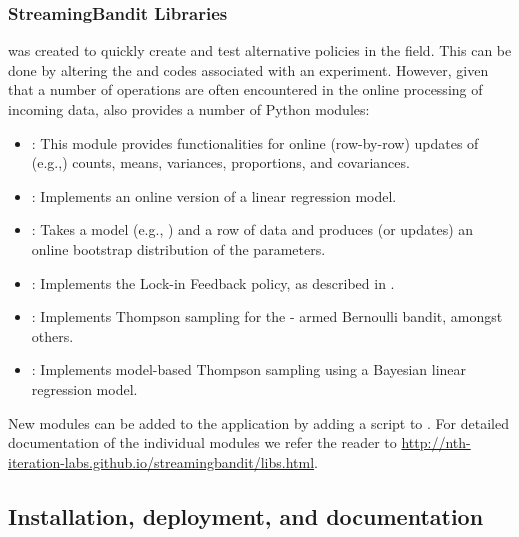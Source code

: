 \documentclass[nojss]{jss}
\begin{document}
\subsubsection{StreamingBandit Libraries}
 was created to quickly create and test alternative policies in the field. This can be done by altering the  and  codes associated with an experiment. However, given that a number of operations are often encountered in the online processing of incoming data,  also provides a number of Python modules:
\begin{itemize}
\item {}: This module provides functionalities for online (row-by-row) updates of (e.g.,) counts, means, variances, proportions, and covariances.
\item {}: Implements an online version of a linear regression model.
\item {}: Takes a model (e.g., ) and a row of data and produces (or updates) an online bootstrap distribution of the parameters.
\item {}: Implements the Lock-in Feedback policy, as described in \citep{Kaptein2014d}.
\item {}: Implements Thompson sampling for the - armed Bernoulli bandit, amongst others.
\item {}: Implements model-based Thompson sampling using a Bayesian linear regression model.
\end{itemize}
New modules can be added to the application by adding a script to . For detailed documentation of the individual modules we refer the reader to \url{http://nth-iteration-labs.github.io/streamingbandit/libs.html}.

\subsection{Installation, deployment, and documentation}
\end{document}
